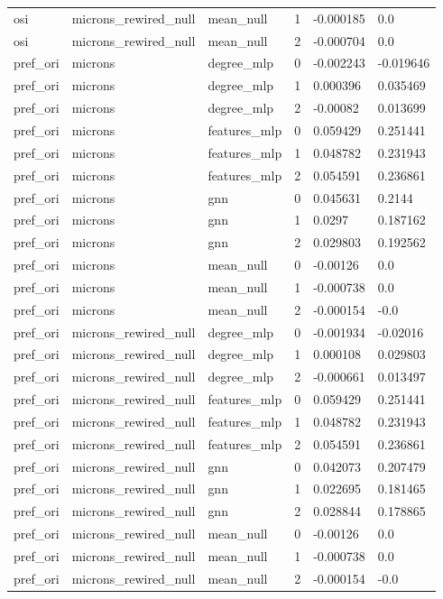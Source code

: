 \begin{table}[htbp]
\begin{tabular}{llllll}
    osi & microns\_rewired\_null & mean\_null & 1 & -0.000185 & 0.0 \\
    osi & microns\_rewired\_null & mean\_null & 2 & -0.000704 & 0.0 \\
    pref\_ori & microns & degree\_mlp & 0 & -0.002243 & -0.019646 \\
    pref\_ori & microns & degree\_mlp & 1 & 0.000396 & 0.035469 \\
    pref\_ori & microns & degree\_mlp & 2 & -0.00082 & 0.013699 \\
    pref\_ori & microns & features\_mlp & 0 & 0.059429 & 0.251441 \\
    pref\_ori & microns & features\_mlp & 1 & 0.048782 & 0.231943 \\
    pref\_ori & microns & features\_mlp & 2 & 0.054591 & 0.236861 \\
    pref\_ori & microns & gnn & 0 & 0.045631 & 0.2144 \\
    pref\_ori & microns & gnn & 1 & 0.0297 & 0.187162 \\
    pref\_ori & microns & gnn & 2 & 0.029803 & 0.192562 \\
    pref\_ori & microns & mean\_null & 0 & -0.00126 & 0.0 \\
    pref\_ori & microns & mean\_null & 1 & -0.000738 & 0.0 \\
    pref\_ori & microns & mean\_null & 2 & -0.000154 & -0.0 \\
    pref\_ori & microns\_rewired\_null & degree\_mlp & 0 & -0.001934 & -0.02016 \\
    pref\_ori & microns\_rewired\_null & degree\_mlp & 1 & 0.000108 & 0.029803 \\
    pref\_ori & microns\_rewired\_null & degree\_mlp & 2 & -0.000661 & 0.013497 \\
    pref\_ori & microns\_rewired\_null & features\_mlp & 0 & 0.059429 & 0.251441 \\
    pref\_ori & microns\_rewired\_null & features\_mlp & 1 & 0.048782 & 0.231943 \\
    pref\_ori & microns\_rewired\_null & features\_mlp & 2 & 0.054591 & 0.236861 \\
    pref\_ori & microns\_rewired\_null & gnn & 0 & 0.042073 & 0.207479 \\
    pref\_ori & microns\_rewired\_null & gnn & 1 & 0.022695 & 0.181465 \\
    pref\_ori & microns\_rewired\_null & gnn & 2 & 0.028844 & 0.178865 \\
    pref\_ori & microns\_rewired\_null & mean\_null & 0 & -0.00126 & 0.0 \\
    pref\_ori & microns\_rewired\_null & mean\_null & 1 & -0.000738 & 0.0 \\
    pref\_ori & microns\_rewired\_null & mean\_null & 2 & -0.000154 & -0.0 \\
    \bottomrule
  \end{tabular}
\end{table}
